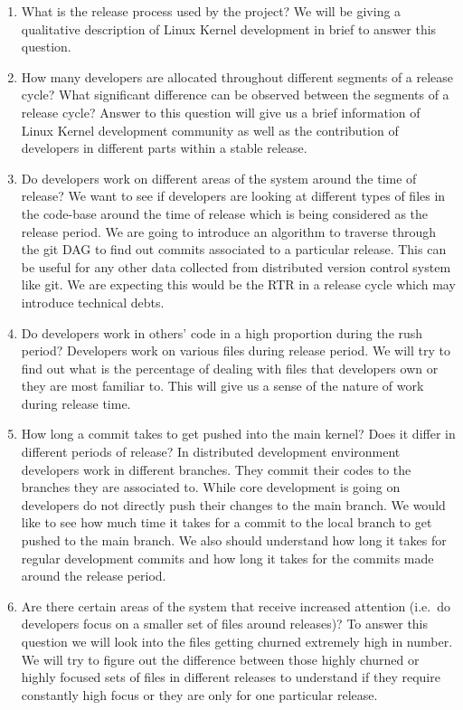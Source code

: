 \documentclass{acm_proc_article-sp}
\begin{document}
\renewcommand{\labelenumi}{RQ\theenumi:}
\begin{enumerate}
\item What is the release process used by the project? \newline
We will be giving a qualitative description of Linux Kernel development in brief to answer this question.
\item How many developers are allocated throughout different segments of a release cycle? What significant difference can be observed between the segments of a release cycle? \newline
Answer to this question will give us a brief information of Linux Kernel development community as well as the contribution of developers in different parts within a stable release.
\item Do developers work on different areas of the system around the time of release? \newline
We want to see if developers are looking at different types of files in the code-base around the time of release which is being considered as the release period. We are going to introduce an algorithm to traverse through the git DAG to find out commits associated to a particular release. This can be useful for any other data collected from distributed version control system like git. We are expecting this would be the RTR in a release cycle which may introduce technical debts.
\item Do developers work in others' code in a high proportion during the rush period?\newline
Developers work on various files during release period. We will try to find out what is the percentage of dealing with files that developers own or they are most familiar to. This will give us a sense of the nature of work during release time.
\item How long a commit takes to get pushed into the main kernel? Does it differ in different periods of release?\newline
In distributed development environment developers work in different branches. They commit their codes to the branches they are associated to. While core development is going on developers do not directly push their changes to the main branch. We would like to see how much time it takes for a commit to the local branch to get pushed to the main branch. We also should understand how long it takes for regular development commits and how long it takes for the commits made around the release period.
\item Are there certain areas of the system that receive increased attention (i.e.\ do developers focus on a smaller set of files around releases)? \newline
To answer this question we will look into the files getting churned extremely high in number. We will try to figure out the difference between those highly churned or highly focused sets of files in different releases to understand if they require constantly high focus or they are only for one particular release.
\end{enumerate}
\end{document}
